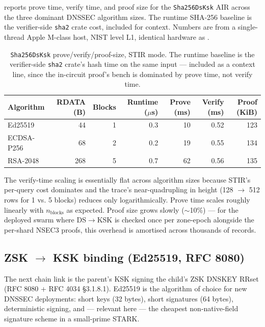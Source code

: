 \documentclass[11pt,a4paper]{article}
\theoremstyle{definition}
\theoremstyle{plain}
\begin{document}
 reports prove time, verify time, and proof
size for the \texttt{Sha256DsKsk} AIR across the three dominant
DNSSEC algorithm sizes.  The runtime SHA-256 baseline is the
verifier-side \texttt{sha2} crate cost, included for context.
Numbers are from a single-thread Apple M-class host, NIST level L1,
identical hardware as .

\begin{table}[h]
\centering\small
\begin{tabular}{lrr|rrr|r}
\toprule
Algorithm & RDATA (B) & Blocks & Runtime ($\mu$s) & Prove (ms) & Verify (ms) & Proof (KiB) \\
\midrule
Ed25519     &  44 & 1 & 0.3 &   10 & 0.52 & 123 \\
ECDSA-P256  &  68 & 2 & 0.2 &   19 & 0.55 & 134 \\
RSA-2048    & 268 & 5 & 0.7 &   62 & 0.56 & 135 \\
\bottomrule
\end{tabular}
\caption{\texttt{Sha256DsKsk} prove/verify/proof-size, STIR mode.
The runtime baseline is the verifier-side
\texttt{sha2} crate's hash time on the same input — included as a
context line, since the in-circuit proof's bench is dominated by
prove time, not verify time.}
\label{tab:dsksk-bench}
\end{table}

The verify-time scaling is essentially flat across algorithm sizes
because STIR's per-query cost dominates and the trace's
near-quadrupling in height (128 $\to$ 512 rows for 1 vs. 5 blocks)
reduces only logarithmically.  Prove time scales roughly linearly
with $n_{\text{blocks}}$ as expected.  Proof size grows slowly
($\sim$10\%) — for the deployed swarm where DS$\to$KSK is checked
once per zone-epoch alongside the per-shard NSEC3 proofs, this
overhead is amortised across thousands of records.

\subsection{ZSK $\to$ KSK binding (Ed25519, RFC 8080)}
\label{sec:ed25519-zskksk}

The next chain link is the parent's KSK signing the child's ZSK
DNSKEY RRset (RFC 8080 + RFC 4034 \S3.1.8.1).  Ed25519 is the
algorithm of choice for new DNSSEC deployments: short keys (32 bytes),
short signatures (64 bytes), deterministic signing, and — relevant
here — the cheapest non-native-field signature scheme in a
small-prime STARK.
\end{document}
